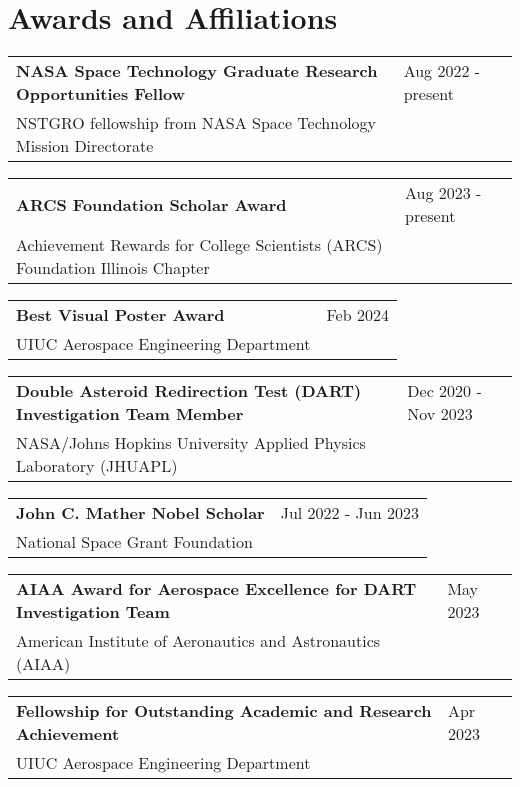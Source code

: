 \documentclass[letterpaper,12pt]{article}
\begin{document}
\section{Awards and Affiliations}
\begin{tabularx}{\linewidth}{@{}l X@{}}
\textbf{NASA Space Technology Graduate Research Opportunities Fellow} & \hfill Aug 2022 - present \\[3.75pt]
NSTGRO fellowship from NASA Space Technology Mission Directorate & \hfill \\[3.75pt]
\end{tabularx}
\begin{tabularx}{\linewidth}{@{}l X@{}}
\textbf{ARCS Foundation Scholar Award} & \hfill Aug 2023 - present \\[3.75pt]
Achievement Rewards for College Scientists (ARCS) Foundation Illinois Chapter & \hfill \\[3.75pt]
\end{tabularx}
\begin{tabularx}{\linewidth}{@{}l X@{}}
\textbf{Best Visual Poster Award} & \hfill Feb 2024 \\[3.75pt]
UIUC Aerospace Engineering Department & \hfill \\[3.75pt]
\end{tabularx}
\begin{tabularx}{\linewidth}{@{}l X@{}}
\textbf{Double Asteroid Redirection Test (DART) Investigation Team Member} & \hfill Dec 2020 - Nov 2023 \\[3.75pt]
NASA/Johns Hopkins University Applied Physics Laboratory (JHUAPL) & \hfill \\[3.75pt]
\end{tabularx}
\begin{tabularx}{\linewidth}{@{}l X@{}}
\textbf{John C. Mather Nobel Scholar} & \hfill Jul 2022 - Jun 2023 \\[3.75pt]
National Space Grant Foundation & \hfill \\[3.75pt]
\end{tabularx}
\begin{tabularx}{\linewidth}{@{}l X@{}}
\textbf{AIAA Award for Aerospace Excellence for DART Investigation Team} & \hfill May 2023 \\[3.75pt]
American Institute of Aeronautics and Astronautics (AIAA) & \hfill \\[0.75pt]
\end{tabularx}
\begin{tabularx}{\linewidth}{@{}l X@{}}
\textbf{Fellowship for Outstanding Academic and Research Achievement} & \hfill Apr 2023 \\[3.75pt]
UIUC Aerospace Engineering Department & \hfill \\[3.75pt]
\end{tabularx}
\end{document}

